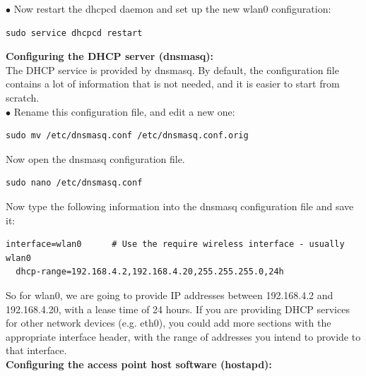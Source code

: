 \documentclass[journal,12pt,onecolumn]{IEEEtran}
\begin{document}
\begin{flushleft}
$\bullet$ Now restart the dhcpcd daemon and set up the new wlan0 configuration:\\
\bigskip
\begin{lstlisting}[frame=single,linewidth=8cm,breaklines=true]
sudo service dhcpcd restart
\end{lstlisting}
\bigskip

\textbf{Configuring the DHCP server (dnsmasq):} \\

The DHCP service is provided by dnsmasq. By default, the configuration file contains a lot of information that is not needed, and it is easier to start from scratch.\\ 
\medskip
$\bullet$ Rename this configuration file, and edit a new one: \\
\bigskip
\begin{lstlisting}[frame=single,linewidth=15cm,breaklines=true]
sudo mv /etc/dnsmasq.conf /etc/dnsmasq.conf.orig  
\end{lstlisting}
\bigskip

Now open the dnsmasq configuration file. \\
\bigskip
\begin{lstlisting}[frame=single,linewidth=15cm,breaklines=true]
sudo nano /etc/dnsmasq.conf 
\end{lstlisting}
\bigskip

Now type the following information into the dnsmasq configuration file and save it:\\
\bigskip
\begin{lstlisting}[frame=single,linewidth=15cm,breaklines=true]
interface=wlan0      # Use the require wireless interface - usually wlan0
  dhcp-range=192.168.4.2,192.168.4.20,255.255.255.0,24h
\end{lstlisting}
\bigskip

So for wlan0, we are going to provide IP addresses between 192.168.4.2 and 192.168.4.20, with a lease time of 24 hours. If you are providing DHCP services for other network devices (e.g. eth0), you could add more sections with the appropriate interface header, with the range of addresses you intend to provide to that interface. \\
\bigskip
\textbf{Configuring the access point host software (hostapd):} \\
\medskip


\end{flushleft}
\end{document}
